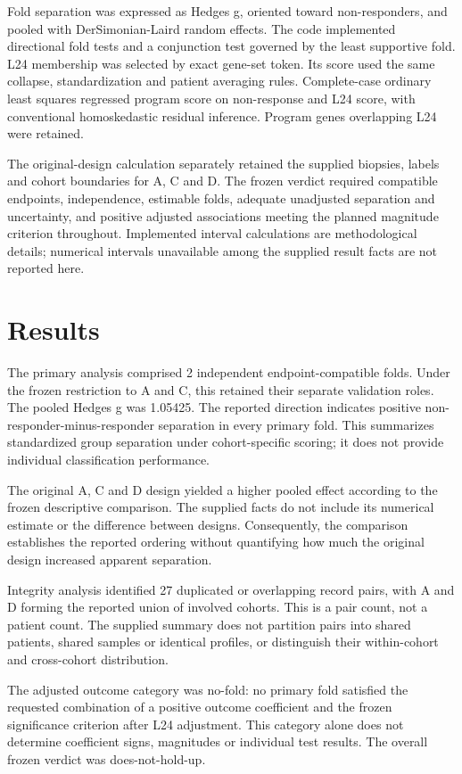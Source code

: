\documentclass[10pt,a4paper]{article}
\begin{document}
\par
Fold separation was expressed as Hedges g, oriented toward non-responders, and pooled with DerSimonian-Laird random effects. The code implemented directional fold tests and a conjunction test governed by the least supportive fold. L24 membership was selected by exact gene-set token. Its score used the same collapse, standardization and patient averaging rules. Complete-case ordinary least squares regressed program score on non-response and L24 score, with conventional homoskedastic residual inference. Program genes overlapping L24 were retained.
\par
The original-design calculation separately retained the supplied biopsies, labels and cohort boundaries for A, C and D. The frozen verdict required compatible endpoints, independence, estimable folds, adequate unadjusted separation and uncertainty, and positive adjusted associations meeting the planned magnitude criterion throughout. Implemented interval calculations are methodological details; numerical intervals unavailable among the supplied result facts are not reported here.
\par
\section*{Results}
The primary analysis comprised 2 independent endpoint-compatible folds. Under the frozen restriction to A and C, this retained their separate validation roles. The pooled Hedges g was 1.05425. The reported direction indicates positive non-responder-minus-responder separation in every primary fold. This summarizes standardized group separation under cohort-specific scoring; it does not provide individual classification performance.
\par
The original A, C and D design yielded a higher pooled effect according to the frozen descriptive comparison. The supplied facts do not include its numerical estimate or the difference between designs. Consequently, the comparison establishes the reported ordering without quantifying how much the original design increased apparent separation.
\par
Integrity analysis identified 27 duplicated or overlapping record pairs, with A and D forming the reported union of involved cohorts. This is a pair count, not a patient count. The supplied summary does not partition pairs into shared patients, shared samples or identical profiles, or distinguish their within-cohort and cross-cohort distribution.
\par
The adjusted outcome category was no-fold: no primary fold satisfied the requested combination of a positive outcome coefficient and the frozen significance criterion after L24 adjustment. This category alone does not determine coefficient signs, magnitudes or individual test results. The overall frozen verdict was does-not-hold-up.
\par
\end{document}
